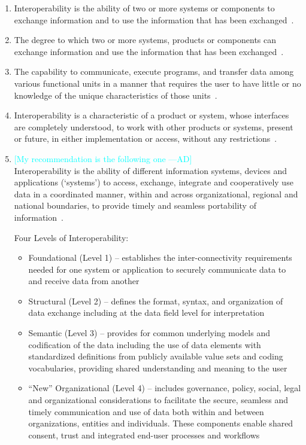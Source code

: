 \documentclass[letterpaper,cleveref]{lipics-v2019}
\newcommand{\authornote}[3]{\textcolor{#1}{[#3 ---#2]}}
\newcommand{\authornote}[3]{}
\newcommand{\ad}[1]{\authornote{cyan}{AD}{#1}} %
\theoremstyle{definition}
\begin{document}
\begin{enumerate}[(1).]
    \item Interoperability is the ability of two or more systems or components to exchange information and to use the information that has been exchanged~\cite{IEEE1991}.
	\item The degree to which two or more systems, products or components can exchange information and use the information that has been exchanged~\cite{ISO/IEC25010}.
	\item The capability to communicate, execute programs, and transfer data among various functional units in a manner that requires the user to have little or no knowledge of the unique characteristics of those units~\cite{ISO/IEC/IEEE24765}.
	\item Interoperability is a characteristic of a product or system, whose interfaces are completely understood, to work with other products or systems, present or future, in either implementation or access, without any restrictions~\cite{AFUL}.
    \item \ad{My recommendation is the following one}\\
    Interoperability is the ability of different information systems, devices and applications (‘systems’) to access, exchange, integrate and cooperatively use data in a coordinated manner, within and across organizational, regional and national boundaries, to provide timely and seamless portability of information~\cite{HIMSS}.
        
    Four Levels of Interoperability:
    \begin{itemize}
        \item Foundational (Level 1) – establishes the inter-connectivity requirements needed for one system or application to securely communicate data to and receive data from another

        \item Structural (Level 2) – defines the format, syntax, and organization of data exchange including at the data field level for interpretation

        \item Semantic (Level 3) – provides for common underlying models and codification of the data including the use of data elements with standardized definitions from publicly available value sets and coding vocabularies, providing shared understanding and meaning to the user

        \item “New” Organizational (Level 4) – includes governance, policy, social, legal and organizational considerations to facilitate the secure, seamless and timely communication and use of data both within and between organizations, entities and individuals. These components enable shared consent, trust and integrated end-user processes and workflows
    \end{itemize}
\end{enumerate}
\end{document}
